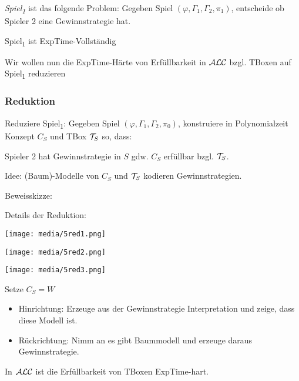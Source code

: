 \begin{definition}

\emph{Spiel\textsubscript{1}} ist das folgende Problem: Gegeben Spiel
$\left( \varphi,\Gamma_{1},\Gamma_{2},\pi_{1} \right)$, entscheide ob
Spieler 2 eine Gewinnstrategie hat.
\end{definition}

\begin{theorem}
Spiel\textsubscript{1} ist ExpTime-Vollständig
\end{theorem}

Wir wollen nun die ExpTime-Härte von Erfüllbarkeit in $\mathcal{A}\mathcal{L}\mathcal{C}$ bzgl. TBoxen auf Spiel\textsubscript{1} reduzieren

\subsubsection{Reduktion}\label{reduktion}

Reduziere Spiel\textsubscript{1}: Gegeben Spiel
$\left( \varphi,\Gamma_{1},\Gamma_{2},\pi_{0} \right)$, konstruiere in
Polynomialzeit Konzept $C_{S}$ und TBox $\mathcal{T}_{S}$ so, dass: 

\begin{lemma}Spieler 2 hat Gewinnstrategie in $S$ gdw. $C_{S}$ erfüllbar bzgl. $\mathcal{T}_{S}$.\end{lemma}

Idee: (Baum)-Modelle von $C_S$ und $\mathcal{T}_S$ kodieren Gewinnstrategien.

Beweisskizze:

Details der Reduktion:

\texttt{[image: media/5red1.png]}

\texttt{[image: media/5red2.png]}

\texttt{[image: media/5red3.png]}

Setze $C_S = W$ 

\begin{itemize}
\item
  Hinrichtung: Erzeuge aus der Gewinnstrategie Interpretation und zeige, dass diese Modell ist.
\item
  Rückrichtung: Nimm an es gibt Baummodell und erzeuge daraus
  Gewinnstrategie.
\end{itemize}

\begin{theorem}
In $\mathcal{A}\mathcal{L}\mathcal{C}$ ist die Erfüllbarkeit von TBoxen ExpTime-hart.
\end{theorem}

